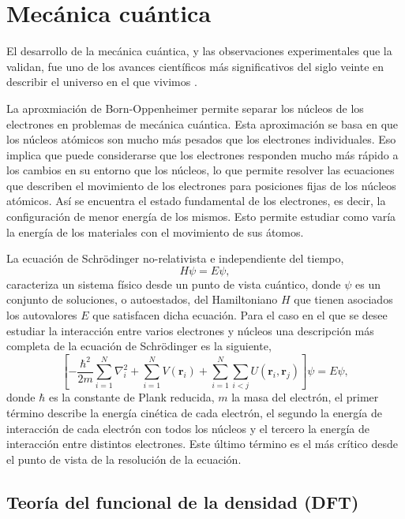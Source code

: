\section{Mecánica cuántica}

El desarrollo de la mecánica cuántica, y las observaciones experimentales que la
validan, fue uno de los avances científicos más significativos del siglo veinte
en describir el universo en el que vivimos \cite{shankar2012}.

La aproxmiación de Born-Oppenheimer permite separar los núcleos de los electrones 
en problemas de mecánica cuántica. Esta aproximación se basa en que los núcleos 
atómicos son mucho más pesados que los electrones individuales. Eso implica que 
puede considerarse que los electrones responden mucho más rápido a los cambios en 
su entorno que los núcleos, lo que permite resolver las ecuaciones que describen 
el movimiento de los electrones para posiciones fijas de los núcleos atómicos. Así 
se encuentra el estado fundamental de los electrones, es decir, la configuración 
de menor energía de los mismos. Esto permite estudiar como varía la energía de los 
materiales con el movimiento de sus átomos.

La ecuación de Schrödinger no-relativista e independiente del tiempo,
\begin{equation}\label{eq:schrodinger}
    H \psi = E \psi,
\end{equation}
caracteriza un sistema físico desde un punto de vista cuántico, donde $\psi$ es un
conjunto de soluciones, o autoestados, del Hamiltoniano $H$ que tienen asociados los
autovalores $E$ que satisfacen dicha ecuación. Para el caso en el que se desee estudiar
la interacción entre varios electrones y núcleos una descripción más completa de la 
ecuación de Schrödinger es la siguiente,
\begin{equation}\label{eq:schrodinger}
    \left[ - \frac{\hbar^2}{2 m} \sum_{i=1}^N \nabla_i^2 + \sum_{i=1}^N V(\mathbf{r}_i) + \sum_{i=1}^N \sum_{i<j} U(\mathbf{r}_i, \mathbf{r}_j) \right] \psi = E \psi,
\end{equation}
donde $\hbar$ es la constante de Plank reducida, $m$ la masa del electrón, el primer 
término describe la energía cinética de cada electrón, el segundo la energía de 
interacción de cada electrón con todos los núcleos y el tercero la energía de 
interacción entre distintos electrones. Este último término es el más crítico desde 
el punto de vista de la resolución de la ecuación.


\subsection{Teoría del funcional de la densidad (DFT)}

